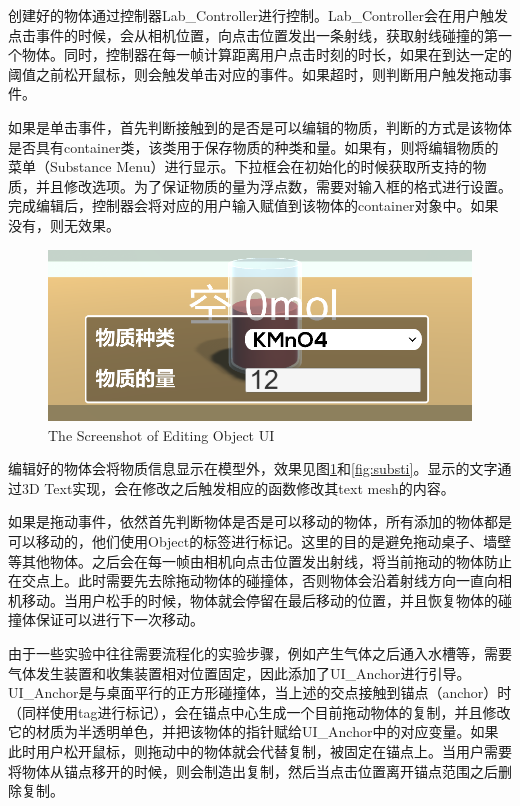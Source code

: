 	创建好的物体通过控制器Lab\_Controller进行控制。Lab\_Controller会在用户触发点击事件的时候，会从相机位置，向点击位置发出一条射线，获取射线碰撞的第一个物体。同时，控制器在每一帧计算距离用户点击时刻的时长，如果在到达一定的阈值之前松开鼠标，则会触发单击对应的事件。如果超时，则判断用户触发拖动事件。

	如果是单击事件，首先判断接触到的是否是可以编辑的物质，判断的方式是该物体是否具有container类，该类用于保存物质的种类和量。如果有，则将编辑物质的菜单（Substance Menu）进行显示。下拉框会在初始化的时候获取所支持的物质，并且修改选项。为了保证物质的量为浮点数，需要对输入框的格式进行设置。完成编辑后，控制器会将对应的用户输入赋值到该物体的container对象中。如果没有，则无效果。
	
\begin{figure}[!htp]
  \centering
  \includegraphics[width=12cm]{figure/subs.png}
    {The Screenshot of Editing Object UI}
 \label{fig:subs}
\end{figure}

编辑好的物体会将物质信息显示在模型外，效果见图\ref{fig:subs}和\ref{fig:substi}。显示的文字通过3D Text实现，会在修改之后触发相应的函数修改其text mesh的内容。

	如果是拖动事件，依然首先判断物体是否是可以移动的物体，所有添加的物体都是可以移动的，他们使用Object的标签进行标记。这里的目的是避免拖动桌子、墙壁等其他物体。之后会在每一帧由相机向点击位置发出射线，将当前拖动的物体防止在交点上。此时需要先去除拖动物体的碰撞体，否则物体会沿着射线方向一直向相机移动。当用户松手的时候，物体就会停留在最后移动的位置，并且恢复物体的碰撞体保证可以进行下一次移动。

	由于一些实验中往往需要流程化的实验步骤，例如产生气体之后通入水槽等，需要气体发生装置和收集装置相对位置固定，因此添加了UI\_Anchor进行引导。UI\_Anchor是与桌面平行的正方形碰撞体，当上述的交点接触到锚点（anchor）时（同样使用tag进行标记），会在锚点中心生成一个目前拖动物体的复制，并且修改它的材质为半透明单色，并把该物体的指针赋给UI\_Anchor中的对应变量。如果此时用户松开鼠标，则拖动中的物体就会代替复制，被固定在锚点上。当用户需要将物体从锚点移开的时候，则会制造出复制，然后当点击位置离开锚点范围之后删除复制。
	
